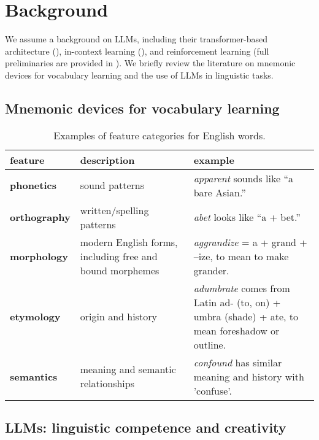 
\section{Background} \label{sec:background}

We assume a background on LLMs, including their transformer-based architecture (), in-context learning (), and reinforcement learning (full preliminaries are provided in ). We briefly review the literature on mnemonic devices for vocabulary learning and the use of LLMs in linguistic tasks.

\subsection{Mnemonic devices for vocabulary learning} \label{sec:mnemonic-review}



\begin{table*}[htb]
\centering
\caption{Examples of feature categories for English words.}
\label{tab:linguistic-features}
\begin{tabularx}{\textwidth}{l >{\raggedright\arraybackslash}X >{\raggedright\arraybackslash}X}
\toprule
\textbf{feature} & \textbf{description} & \textbf{example} \\
\midrule
\textbf{phonetics} & sound patterns & \emph{apparent} sounds like “a bare Asian.” \\
\addlinespace
\textbf{orthography} & written/spelling patterns & \emph{abet} looks like “a + bet.” \\
\addlinespace
\textbf{morphology} & modern English forms, including free and bound morphemes & \emph{aggrandize} = a + grand + –ize, to mean to make grander. \\
\addlinespace
\textbf{etymology} & origin and history & \emph{adumbrate} comes from Latin ad- (to, on) + umbra (shade) + ate, to mean foreshadow or outline. \\
\addlinespace
\textbf{semantics} & meaning and semantic relationships & \emph{confound} has similar meaning and history with 'confuse'. \\
\bottomrule
\end{tabularx}
\end{table*}
\subsection{LLMs: linguistic competence and creativity} \label{sec:llm-linguistic-competence}
